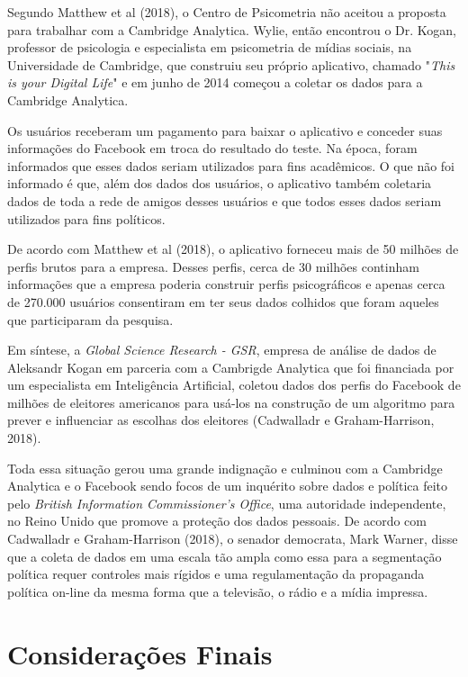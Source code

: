Segundo Matthew et al (2018), o Centro de Psicometria não aceitou a
proposta para trabalhar com a Cambridge Analytica. Wylie, então
encontrou o Dr. Kogan, professor de psicologia e especialista em
psicometria de mídias sociais, na Universidade de Cambridge, que
construiu seu próprio aplicativo, chamado "\emph{This is your Digital
Life}" e em junho de 2014 começou a coletar os dados para a Cambridge
Analytica.

Os usuários receberam um pagamento para baixar o aplicativo e conceder
suas informações do Facebook em troca do resultado do teste. Na época,
foram informados que esses dados seriam utilizados para fins acadêmicos.
O que não foi informado é que, além dos dados dos usuários, o aplicativo
também coletaria dados de toda a rede de amigos desses usuários e que
todos esses dados seriam utilizados para fins políticos.

De acordo com Matthew et al (2018), o aplicativo forneceu mais de 50
milhões de perfis brutos para a empresa. Desses perfis, cerca de 30
milhões continham informações que a empresa poderia construir perfis
psicográficos e apenas cerca de 270.000 usuários consentiram em ter seus
dados colhidos que foram aqueles que participaram da pesquisa.

Em síntese, a \emph{Global Science Research - GSR}, empresa de análise
de dados de Aleksandr Kogan em parceria com a Cambrigde Analytica que
foi financiada por um especialista em Inteligência Artificial, coletou
dados dos perfis do Facebook de milhões de eleitores americanos para
usá-los na construção de um algoritmo para prever e influenciar as
escolhas dos eleitores (Cadwalladr e Graham-Harrison, 2018).

Toda essa situação gerou uma grande indignação e culminou com a
Cambridge Analytica e o Facebook sendo focos de um inquérito sobre dados
e política feito pelo \emph{British Information Commissioner's Office},
uma autoridade independente, no Reino Unido que promove a proteção dos
dados pessoais\emph{.} De acordo com Cadwalladr e Graham-Harrison
(2018), o senador democrata, Mark Warner, disse que a coleta de dados em
uma escala tão ampla como essa para a segmentação política requer
controles mais rígidos e uma regulamentação da propaganda política
on-line da mesma forma que a televisão, o rádio e a mídia impressa.

\section{Considerações Finais}

